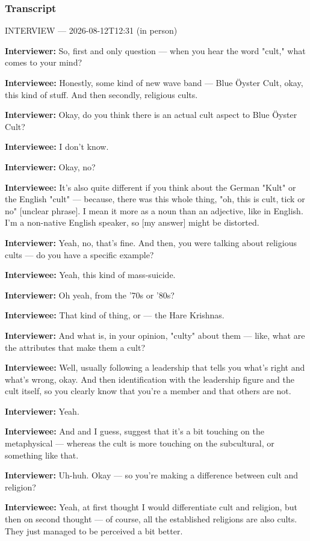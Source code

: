 \subsubsection*{Transcript}
INTERVIEW — 2026-08-12T12:31 (in person)

\textbf{Interviewer:} So, first and only question — when you hear the word "cult," what comes to your mind?

\textbf{Interviewee:} Honestly, some kind of new wave band — Blue Öyster Cult, okay, this kind of stuff. And then secondly, religious cults.

\textbf{Interviewer:} Okay, do you think there is an actual cult aspect to Blue Öyster Cult?

\textbf{Interviewee:} I don't know.

\textbf{Interviewer:} Okay, no?

\textbf{Interviewee:} It's also quite different if you think about the German "Kult" or the English "cult" — because, there was this whole thing, "oh, this is cult, tick or no" [unclear phrase]. I mean it more as a noun than an adjective, like in English. I'm a non-native English speaker, so [my answer] might be distorted.

\textbf{Interviewer:} Yeah, no, that's fine. And then, you were talking about religious cults — do you have a specific example?

\textbf{Interviewee:} Yeah, this kind of mass-suicide.

\textbf{Interviewer:} Oh yeah, from the '70s or '80s?

\textbf{Interviewee:} That kind of thing, or — the Hare Krishnas.

\textbf{Interviewer:} And what is, in your opinion, "culty" about them — like, what are the attributes that make them a cult?

\textbf{Interviewee:} Well, usually following a leadership that tells you what's right and what's wrong, okay. And then identification with the leadership figure and the cult itself, so you clearly know that you're a member and that others are not.

\textbf{Interviewer:} Yeah.

\textbf{Interviewee:} And and I guess, suggest that it's a bit touching on the metaphysical — whereas the cult is more touching on the subcultural, or something like that.

\textbf{Interviewer:} Uh-huh. Okay — so you're making a difference between cult and religion?

\textbf{Interviewee:} Yeah, at first thought I would differentiate cult and religion, but then on second thought — of course, all the established religions are also cults. They just managed to be perceived a bit better.

